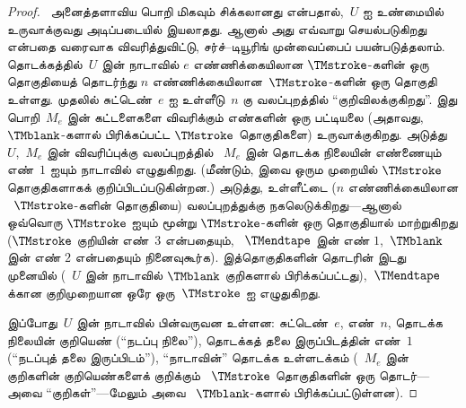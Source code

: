 \documentclass[../../../include/open-logic-section]{subfiles}
\begin{document}
\begin{proof}
  ~அனைத்தளாவிய பொறி மிகவும் சிக்கலானது என்பதால்,~$U$ ஐ உண்மையில்
  உருவாக்குவது அடிப்படையில் இயலாதது. ஆனால் அது எவ்வாறு செயல்படுகிறது
  என்பதை வரைவாக விவரித்துவிட்டு, சர்ச்--டியூரிங் முன்வைப்பைப்
  பயன்படுத்தலாம். தொடக்கத்தில்~$U$ இன் நாடாவில் $e$
  எண்ணிக்கையிலான $\TMstroke$-களின் ஒரு தொகுதியைத் தொடர்ந்து $n$
  எண்ணிக்கையிலான~$\TMstroke$-களின் ஒரு தொகுதி உள்ளது. முதலில்
  சுட்டெண்~$e$ ஐ உள்ளீடு~$n$ கு வலப்புறத்தில் ``குறிவிலக்குகிறது''.
  இது பொறி~$M_e$ இன் கட்டளைகளை விவரிக்கும் எண்களின் ஒரு பட்டியலை
  (அதாவது,~$\TMblank$-களால் பிரிக்கப்பட்ட $\TMstroke$ தொகுதிகளை)
  உருவாக்குகிறது. அடுத்து~$U$,~$M_e$ இன் விவரிப்புக்கு வலப்புறத்தில்
  ~$M_e$ இன் தொடக்க நிலையின் எண்ணையும் எண்~$1$ ஐயும் நாடாவில் எழுதுகிறது.
  (மீண்டும், இவை ஒரும முறையில் $\TMstroke$ தொகுதிகளாகக்
  குறிப்பிடப்படுகின்றன.) அடுத்து, உள்ளீட்டை ($n$ எண்ணிக்கையிலான
  ~$\TMstroke$-களின் தொகுதியை) வலப்புறத்துக்கு நகலெடுக்கிறது---ஆனால்
  ஒவ்வொரு $\TMstroke$ ஐயும் மூன்று $\TMstroke$-களின் ஒரு தொகுதியால்
  மாற்றுகிறது ($\TMstroke$ குறியின் எண்~$3$ என்பதையும்,
  ~$\TMendtape$ இன் எண் $1$,~$\TMblank$ இன் எண் $2$ என்பதையும்
  நினைவுகூர்க). இத்தொகுதிகளின் தொடரின் இடது முனையில் (~$U$ இன்
  நாடாவில் $\TMblank$ குறிகளால் பிரிக்கப்பட்டது),~$\TMendtape$
  க்கான குறிமுறையான ஒரே ஒரு~$\TMstroke$ ஐ எழுதுகிறது.

  இப்போது~$U$ இன் நாடாவில் பின்வருவன உள்ளன: சுட்டெண்~$e$, எண்~$n$,
  தொடக்க நிலையின் குறியெண் (``நடப்பு நிலை''), தொடக்கத் தலை இருப்பிடத்தின்
  எண்~$1$ (``நடப்புத் தலை இருப்பிடம்''), ``நாடாவின்'' தொடக்க
  உள்ளடக்கம் (~$M_e$ இன் குறிகளின் குறியெண்களைக் குறிக்கும்
  ~$\TMstroke$ தொகுதிகளின் ஒரு தொடர்---அவை ``குறிகள்''---மேலும் அவை
  ~$\TMblank$-களால் பிரிக்கப்பட்டுள்ளன).


\end{proof}
\end{document}
